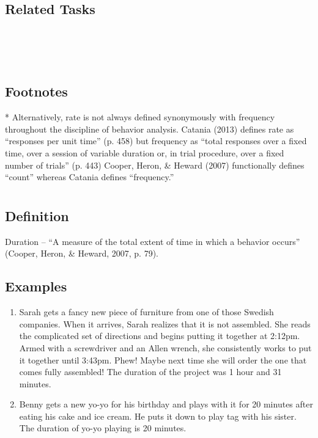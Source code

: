 \subsection{Related Tasks}
\fouriOne{}\\
\fourhOne{}\\
\fourFKFourtySeven{}\\

\subsection{Footnotes}
* Alternatively, rate is not always defined synonymously with frequency throughout the discipline of behavior analysis. Catania (2013) defines rate as ``responses per unit time'' (p. 458) but frequency as ``total responses over a fixed time, over a session of variable duration or, in trial procedure, over a fixed number of trials'' (p. 443) Cooper, Heron, \& Heward (2007) functionally defines ``count'' whereas Catania defines ``frequency.''
%
%
%
%
%
%
%
%
%
%
%
\section{\fouraThree{}}
\subsection{Definition}
Duration – ``A measure of the total extent of time in which a behavior occurs'' (Cooper, Heron, \& Heward, 2007, p. 79).
%
\subsection{Examples}
\begin{enumerate}
\item Sarah gets a fancy new piece of furniture from one of those Swedish companies.  When it arrives, Sarah realizes that it is not assembled.  She reads the complicated set of directions and begins putting it together at 2:12pm. Armed with a screwdriver and an Allen wrench, she consistently works to put it together until 3:43pm. Phew! Maybe next time she will order the one that comes fully assembled! The duration of the project was 1 hour and 31 minutes.
\item Benny gets a new yo-yo for his birthday and plays with it for 20 minutes after eating his cake and ice cream. He puts it down to play tag with his sister. The duration of yo-yo playing is 20 minutes.
\end{enumerate}
%

